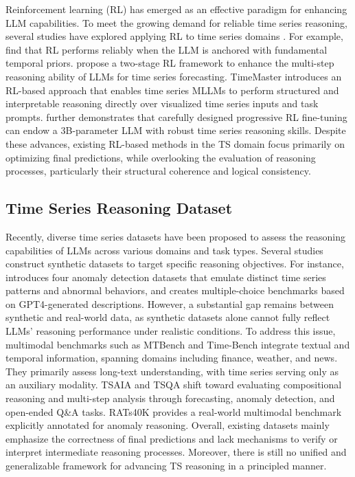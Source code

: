 \documentclass{article}
\theoremstyle{plain}
\theoremstyle{definition}
\theoremstyle{remark}
\begin{document}
Reinforcement learning (RL) \cite{guo2025deepseek, team2025kimi} has emerged as an effective paradigm for enhancing LLM capabilities. To meet the growing demand for reliable time series reasoning, several studies have explored applying RL to time series domains \cite{icml25langtime, parker2025counts}. For example, \citet{guan2025timeomni} find that RL performs reliably when the LLM is anchored with fundamental temporal priors.  \citet{luo2025timeR1} propose a two-stage RL framework to enhance the multi-step reasoning ability of LLMs for time series forecasting. TimeMaster \cite{zhang2025timemaster} introduces an RL-based approach that enables time series MLLMs to perform structured and interpretable reasoning directly over visualized time series inputs and task prompts. \citet{liu2025timer1} further demonstrates that carefully designed progressive RL fine-tuning can endow a 3B-parameter LLM with robust time series reasoning skills. Despite these advances, existing RL-based methods in the TS domain focus primarily on optimizing final predictions, while overlooking the evaluation of reasoning processes, particularly their structural coherence and logical consistency.

\subsection{Time Series Reasoning Dataset} 

Recently, diverse time series datasets have been proposed to assess the reasoning capabilities of LLMs across various domains and task types. Several studies construct synthetic datasets to target specific reasoning objectives. For instance, \citet{zhou2024anomalies} introduces four anomaly detection datasets that emulate distinct time series patterns and abnormal behaviors, and \citet{merrill2024language} creates multiple-choice benchmarks based on GPT4-generated descriptions. However, a substantial gap remains between synthetic and real-world data, as synthetic datasets alone cannot fully reflect LLMs’ reasoning performance under realistic conditions. To address this issue, multimodal benchmarks such as MTBench \cite{chen2025mtbench} and Time-Bench \cite{liu2025timer1} integrate textual and temporal information, spanning domains including finance, weather, and news. They primarily assess long-text understanding, with time series serving only as an auxiliary modality. TSAIA \cite{TSAIA} and TSQA \cite{kong2025timeMQA} shift toward evaluating compositional reasoning and multi-step analysis through forecasting, anomaly detection, and open-ended Q\&A tasks. RATs40K \cite{yang2025timera} provides a real-world multimodal benchmark explicitly annotated for anomaly reasoning. Overall, existing datasets mainly emphasize the correctness of final predictions and lack mechanisms to verify or interpret intermediate reasoning processes. Moreover, there is still no unified and generalizable framework for advancing TS reasoning in a principled manner.
\end{document}
